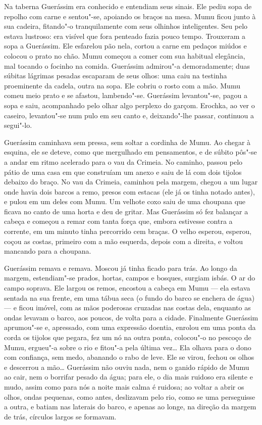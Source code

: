 Na taberna Guerássim era conhecido e entendiam seus sinais. Ele pediu
sopa de repolho com carne e sentou"-se, apoiando os braços na mesa. Mumu
ficou junto à sua cadeira, fitando"-o tranquilamente com seus olhinhos
inteligentes. Seu pelo estava lustroso: era visível que fora penteado
fazia pouco tempo. Trouxeram a sopa a Guerássim. Ele esfarelou pão nela,
cortou a carne em pedaços miúdos e colocou o prato no chão. Mumu começou
a comer com sua habitual elegância, mal tocando o focinho na comida.
Guerássim admirou"-a demoradamente; duas súbitas lágrimas pesadas
escaparam de seus olhos: uma caiu na testinha proeminente da cadela,
outra na sopa. Ele cobriu o rosto com a mão. Mumu comeu meio prato e se
afastou, lambendo"-se. Guerássim levantou"-se, pagou a sopa e saiu,
acompanhado pelo olhar algo perplexo do garçom. Erochka, ao ver o
caseiro, levantou"-se num pulo em seu canto e, deixando"-lhe passar,
continuou a segui"-lo.

Guerássim caminhava sem pressa, sem soltar a cordinha de Mumu. Ao chegar
à esquina, ele se deteve, como que mergulhado em pensamentos, e de
súbito pôs"-se a andar em ritmo acelerado para o vau da Crimeia. No
caminho, passou pelo pátio de uma casa em que construíam um anexo e saiu
de lá com dois tijolos debaixo do braço. No vau da Crimeia, caminhou
pela margem, chegou a um lugar onde havia dois barcos a remo, presos com
estacas (ele já os tinha notado antes), e pulou em um deles com Mumu. Um
velhote coxo saiu de uma choupana que ficava no canto de uma horta e deu
de gritar. Mas Guerássim só fez balançar a cabeça e começou a remar com
tanta força que, embora estivesse contra a corrente, em um minuto tinha
percorrido cem braças. O velho esperou, esperou, coçou as costas,
primeiro com a mão esquerda, depois com a direita, e voltou mancando
para a choupana.

Guerássim remava e remava. Moscou já tinha ficado para trás. Ao longo da
margem, estendiam"-se prados, hortas, campos e bosques, surgiam isbás. O
ar do campo soprava. Ele largou os remos, encostou a cabeça em Mumu ---
ela estava sentada na sua frente, em uma tábua seca (o fundo do barco se
enchera de água) --- e ficou imóvel, com as mãos poderosas cruzadas nas
costas dela, enquanto as ondas levavam o barco, aos poucos, de volta
para a cidade. Finalmente Guerássim aprumou"-se e, apressado, com uma
expressão doentia, enrolou em uma ponta da corda os tijolos que pegara,
fez um nó na outra ponta, colocou"-o no pescoço de Mumu, ergueu"-a sobre o
rio e fitou"-a pela última vez\ldots{} Ela olhava para o dono com confiança,
sem medo, abanando o rabo de leve. Ele se virou, fechou os olhos e
descerrou a mão\ldots{} Guerássim não ouviu nada, nem o ganido rápido de Mumu
ao cair, nem o borrifar pesado da água; para ele, o dia mais ruidoso era
silente e mudo, assim como para nós a noite mais calma é ruidosa; ao
voltar a abrir os olhos, ondas pequenas, como antes, deslizavam pelo
rio, como se uma perseguisse a outra, e batiam nas laterais do barco, e
apenas ao longe, na direção da margem de trás, círculos largos se
formavam.

